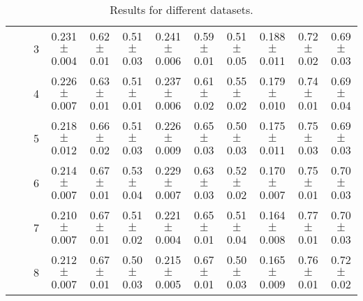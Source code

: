 \begin{table*}
{\begin{tabular}{|l|c|c||c|c|c||c|c|c||c|c|c|}
 & & 3 & \textcolor{gate_color}{0.231$\pm$0.004} & \textcolor{gate_color}{0.62$\pm$0.01} & \textcolor{gate_color}{0.51$\pm$0.03} & \textcolor{mixed_color}{0.241$\pm$0.006} & \textcolor{mixed_color}{0.59$\pm$0.01} & \textcolor{mixed_color}{0.51$\pm$0.05} & \textcolor{pulsed_color}{0.188$\pm$0.011} & \textcolor{pulsed_color}{0.72$\pm$0.02} & \textcolor{pulsed_color}{0.69$\pm$0.03} \\
 & & 4 & \textcolor{gate_color}{0.226$\pm$0.007} & \textcolor{gate_color}{0.63$\pm$0.01} & \textcolor{gate_color}{0.51$\pm$0.01} & \textcolor{mixed_color}{0.237$\pm$0.006} & \textcolor{mixed_color}{0.61$\pm$0.02} & \textcolor{mixed_color}{0.55$\pm$0.02} & \textcolor{pulsed_color}{0.179$\pm$0.010} & \textcolor{pulsed_color}{0.74$\pm$0.01} & \textcolor{pulsed_color}{0.69$\pm$0.04} \\
 & & 5 & \textcolor{gate_color}{0.218$\pm$0.012} & \textcolor{gate_color}{0.66$\pm$0.02} & \textcolor{gate_color}{0.51$\pm$0.03} & \textcolor{mixed_color}{0.226$\pm$0.009} & \textcolor{mixed_color}{0.65$\pm$0.03} & \textcolor{mixed_color}{0.50$\pm$0.03} & \textcolor{pulsed_color}{0.175$\pm$0.011} & \textcolor{pulsed_color}{0.75$\pm$0.03} & \textcolor{pulsed_color}{0.69$\pm$0.03} \\
 & & 6 & \textcolor{gate_color}{0.214$\pm$0.007} & \textcolor{gate_color}{0.67$\pm$0.01} & \textcolor{gate_color}{0.53$\pm$0.04} & \textcolor{mixed_color}{0.229$\pm$0.007} & \textcolor{mixed_color}{0.63$\pm$0.03} & \textcolor{mixed_color}{0.52$\pm$0.02} & \textcolor{pulsed_color}{0.170$\pm$0.007} & \textcolor{pulsed_color}{0.75$\pm$0.01} & \textcolor{pulsed_color}{0.70$\pm$0.03} \\
 & & 7 & \textcolor{gate_color}{0.210$\pm$0.007} & \textcolor{gate_color}{0.67$\pm$0.01} & \textcolor{gate_color}{0.51$\pm$0.02} & \textcolor{mixed_color}{0.221$\pm$0.004} & \textcolor{mixed_color}{0.65$\pm$0.01} & \textcolor{mixed_color}{0.51$\pm$0.04} & \textcolor{pulsed_color}{0.164$\pm$0.008} & \textcolor{pulsed_color}{0.77$\pm$0.01} & \textcolor{pulsed_color}{0.70$\pm$0.03} \\
 & & 8 & \textcolor{gate_color}{0.212$\pm$0.007} & \textcolor{gate_color}{0.67$\pm$0.01} & \textcolor{gate_color}{0.50$\pm$0.03} & \textcolor{mixed_color}{0.215$\pm$0.005} & \textcolor{mixed_color}{0.67$\pm$0.01} & \textcolor{mixed_color}{0.50$\pm$0.03} & \textcolor{pulsed_color}{0.165$\pm$0.009} & \textcolor{pulsed_color}{0.76$\pm$0.01} & \textcolor{pulsed_color}{0.72$\pm$0.02} \\
\hline\hline
\end{tabular}}
\caption{Results for different datasets.}
\label{tab:final_table}
\end{table*}